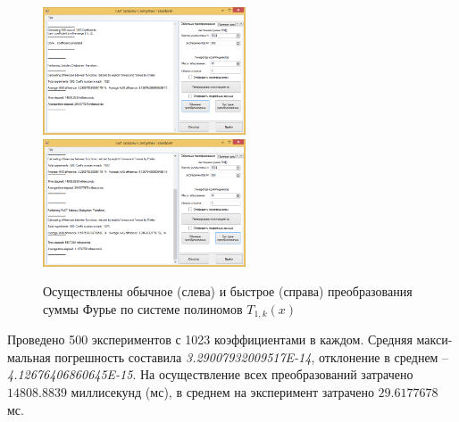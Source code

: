 \begin{figure}[H]
	\begin{center}
		\includegraphics[width=170pt]{pictures/sms-stn-1(4)}
		\quad
		\includegraphics[width=170pt]{pictures/sms-stn-1(5)}
		\caption{
			Осуществлены обычное (слева) и быстрое (справа) преобразования суммы Фурье по системе полиномов $T_{1,k}(x)$
		}\label{sms-stn-1-img3}
	\end{center}
\end{figure}

Проведено 500 экспериментов с 1023 коэффициентами в каждом.
Средняя макси-\linebreak мальная погрешность составила \textit{3.29007932009517E-14}, отклонение в среднем -- \linebreak \textit{4.12676406860645E-15}.
На осуществление всех преобразований затрачено $14808.8839$ \linebreak миллисекунд (мс), в среднем на эксперимент затрачено $29.6177678$ мс.

